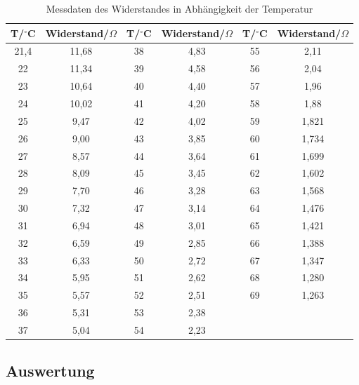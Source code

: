 \documentclass[12pt,a4paper]{article}
\begin{document}
\begin{table}[htbp]
\centering
\begin{tabular}{c|cc|cc|c}

T/$^\circ$C & Widerstand/$\Omega$ & T/$^\circ$C & Widerstand/$\Omega$ & T/$^\circ$C & Widerstand/$\Omega$ \\ \hline
21,4 & 11,68 & 38 & 4,83 & 55 & 2,11 \\ 
22 & 11,34 & 39 & 4,58 & 56 & 2,04 \\ 
23 & 10,64 & 40 & 4,40 & 57 & 1,96 \\ 
24 & 10,02 & 41 & 4,20 & 58 & 1,88 \\ 
25 & 9,47 & 42 & 4,02 & 59 & 1,821 \\ 
26 & 9,00 & 43 & 3,85 & 60 & 1,734 \\ 
27 & 8,57 & 44 & 3,64 & 61 & 1,699 \\ 
28 & 8,09 & 45 & 3,45 & 62 & 1,602 \\ 
29 & 7,70 & 46 & 3,28 & 63 & 1,568 \\ 
30 & 7,32 & 47 & 3,14 & 64 & 1,476 \\ 
31 & 6,94 & 48 & 3,01 & 65 & 1,421 \\ 
32 & 6,59 & 49 & 2,85 & 66 & 1,388 \\ 
33 & 6,33 & 50 & 2,72 & 67 & 1,347 \\ 
34 & 5,95 & 51 & 2,62 & 68 & 1,280 \\ 
35 & 5,57 & 52 & 2,51 & 69 & 1,263 \\ 
36 & 5,31 & 53 & 2,38 & \multicolumn{1}{l}{} & \multicolumn{1}{l}{} \\ 
37 & 5,04 & 54 & 2,23 & \multicolumn{1}{l}{} & \multicolumn{1}{l}{} \\ 
\end{tabular}
\caption{Messdaten des Widerstandes in Abhängigkeit der Temperatur}
\label{tab:1}
\end{table}





\subsection{Auswertung}
\end{document}

